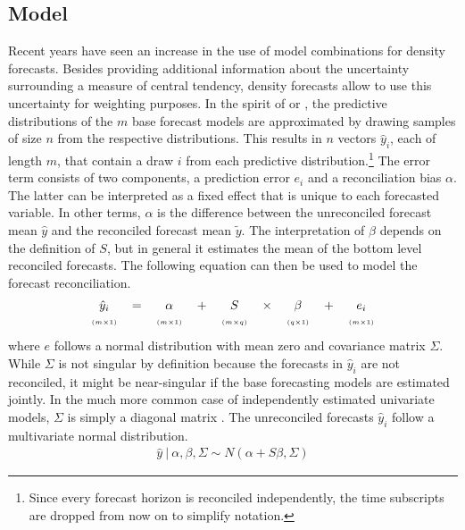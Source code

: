 \documentclass[a4paper,fleqn,11pt]{article}
\begin{document}
\subsection{Model}
Recent years have seen an increase in the use of model combinations for density forecasts. Besides providing additional information about the uncertainty surrounding a measure of central tendency, density forecasts allow to use this uncertainty for weighting purposes. In the spirit of \cite{Kapetanios2015} or \cite{Cesur2016}, the predictive distributions of the $m$ base forecast models are approximated by drawing samples of size $n$ from the respective distributions. This results in $n$ vectors $\hat{y}_{i}$, each of length $m$, that contain a draw $i$ from each predictive distribution.\footnote{Since every forecast horizon is reconciled independently, the time subscripts are dropped from now on to simplify notation.} The error term consists of two components, a prediction error $e_{i}$ and a reconciliation bias $\alpha$. The latter can be interpreted as a fixed effect that is unique to each forecasted variable. In other terms, $\alpha$ is the difference between the unreconciled forecast mean $\hat{y}$ and the reconciled forecast mean $\tilde{y}$. The interpretation of $\beta$ depends on the definition of $S$, but in general it estimates the mean of the bottom level reconciled forecasts. The following equation can then be used to model the forecast reconciliation.
\begin{align}
\label{eq:main}
\begin{tabular}{ccccccccc}
	$\hat{y}_i$ & $=$ & $\alpha$ & + &$S$ & $\times$ & $\beta$ & $+$ & $e_i$ \\
	$\scriptscriptstyle (m\times 1)$ & & $\scriptscriptstyle (m\times 1)$  & & $ \scriptscriptstyle (m\times q) $ & & $\scriptscriptstyle (q\times 1)$ & & $\scriptscriptstyle (m\times 1)$
\end{tabular}
\end{align}
where $e$ follows a normal distribution with mean zero and covariance matrix $\Sigma$. While $\Sigma$ is not singular by definition because the forecasts in $\hat{y}_{i}$ are not reconciled, it might be near-singular if the base forecasting models are estimated jointly. In the much more common case of independently estimated univariate models, $\Sigma$ is simply a diagonal matrix . The unreconciled forecasts $\hat{y}_{i}$ follow a multivariate normal distribution.
\begin{align}
\hat{y}\ |\ \alpha,\beta,\Sigma \sim N(\alpha + S\beta,\Sigma)
\end{align}
\end{document}
